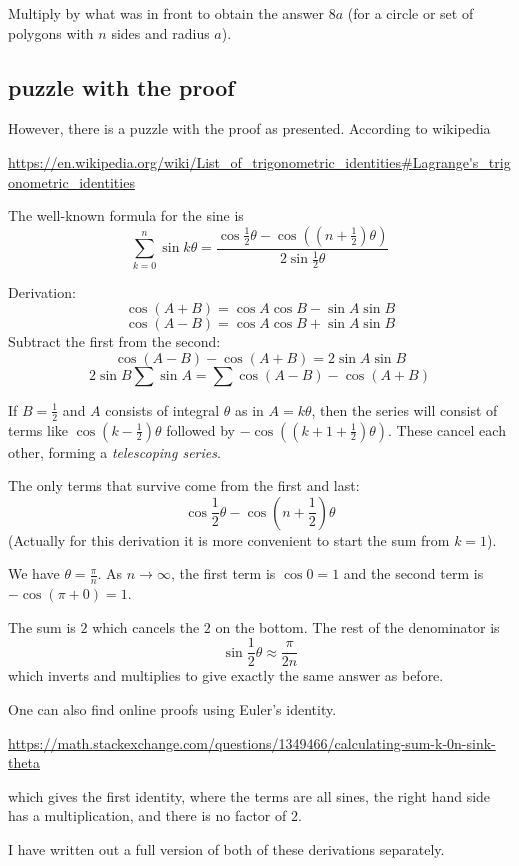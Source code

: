 \documentclass[11pt, oneside]{article}
\begin{document}
Multiply by what was in front to obtain the answer $8a$ (for a circle or set of polygons with $n$ sides and radius $a$).

\subsection*{puzzle with the proof}
However, there is a puzzle with the proof as presented.  According to wikipedia

\url{https://en.wikipedia.org/wiki/List_of_trigonometric_identities#Lagrange's_trigonometric_identities}

The well-known formula for the sine is
\[ \sum_{k=0}^n \sin k \theta = \frac{\cos \frac{1}{2} \theta - \cos ((n + \frac{1}{2}) \theta)}{2 \sin \frac{1}{2} \theta} \]

Derivation:
\[ \cos (A + B) = \cos A \cos B - \sin A \sin B \]
\[ \cos (A - B) = \cos A \cos B + \sin A \sin B \]
Subtract the first from the second:
\[ \cos (A - B) - \cos (A + B) = 2 \sin A \sin B \]
\[ 2 \sin B \sum \sin A = \sum \cos (A - B) - \cos (A + B) \]

If $B = \frac{1}{2}$ and $A$ consists of integral $\theta$ as in $A = k \theta$, then the series will consist of terms like $\cos (k - \frac{1}{2}) \theta$ followed by $- \cos ((k + 1 + \frac{1}{2}) \theta)$.  These cancel each other, forming a \emph{telescoping series}.

The only terms that survive come from the first and last:
\[ \cos \frac{1}{2} \theta - \cos (n+\frac{1}{2}) \theta \]
(Actually for this derivation it is more convenient to start the sum from $k=1$).

We have $\theta = \frac{\pi}{n}$.  As $n \rightarrow \infty$, the first term is $\cos 0 = 1$ and the second term is $- \cos (\pi + 0) = 1$.

The sum is $2$ which cancels the $2$ on the bottom.  The rest of the denominator is
\[ \sin \frac{1}{2} \theta \approx \frac{\pi}{2n}  \]
which inverts and multiplies to give exactly the same answer as before.

One can also find online proofs using Euler's identity.

\url{https://math.stackexchange.com/questions/1349466/calculating-sum-k-0n-sink-theta} 

which gives the first identity, where the terms are all sines, the right hand side has a multiplication, and there is no factor of $2$.

I have written out a full version of both of these derivations separately.  
\end{document}
